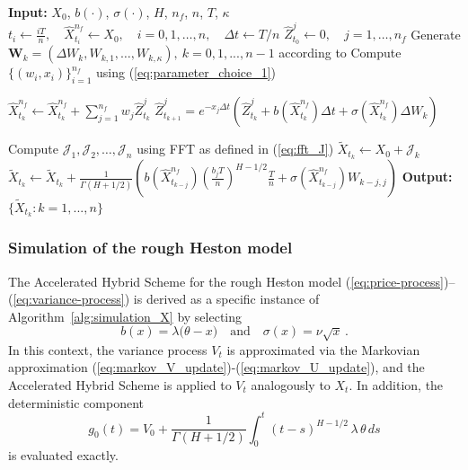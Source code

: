 \documentclass[11pt]{article}%
\theoremstyle{definition}
\begin{document}
\begin{algorithm}[tbh]
    \caption{Simulation of \(X_t\) in (\ref{eq:target_process}) using Accelerated Hybrid Scheme}
    \label{alg:simulation_X}
    \begin{algorithmic}[1]
        \STATE \textbf{Input:} \(X_0\), \(b(\cdot)\), \(\sigma(\cdot)\), \(H\), \(n_f\), \(n\), \(T\), \(\kappa\)
        \STATE \(t_i \gets \tfrac{iT}{n},\quad \widehat{X}_{t_i}^{n_f} \gets X_0,\quad i=0,1,\ldots,n,\quad \Delta t \gets T/n\)
        \STATE \(\widehat{Z}_{t_0}^j \gets 0,\quad j=1,\ldots,n_f\) 
        \STATE Generate \(\mathbf{W}_k = (\Delta W_k, W_{k,1},\ldots,W_{k,\kappa}),\ k=0,1,...,n-1\) according to \cite{bennedsen_2017_FS}
        \STATE Compute \(\{(w_i,x_i)\}_{i=1}^{n_f}\) using (\ref{eq:parameter_choice_1})

            \STATE \(\widehat{X}_{t_k}^{n_f} \gets \widehat{X}_{t_k}^{n_f} + \sum_{j=1}^{n_f} w_j \widehat{Z}_{t_k}^j\)
                \STATE \(\widehat{Z}_{t_{k+1}}^j = e^{-x_j \Delta t} \left(
                    \widehat{Z}_{t_k}^j + b(\widehat{X}_{t_k}^{n_f}) \Delta t + \sigma(\widehat{X}_{t_k}^{n_f})\Delta W_k
                    \right)
                \)
            \ENDFOR
        \ENDFOR

        \STATE Compute \(\mathcal{J}_1,\mathcal{J}_2,\ldots,\mathcal{J}_n\) using FFT as defined in (\ref{eq:fft_J})
            \STATE \(\widetilde{X}_{t_k} \gets X_0 + \mathcal{J}_k\)
                    \STATE \(\widetilde{X}_{t_k} \gets \widetilde{X}_{t_k} + \tfrac{1}{\Gamma(H+1/2)} \left(b(\widehat{X}_{t_{k-j}}^{n_f})\left(\tfrac{b_j T}{n}\right)^{H-1/2} \tfrac{T}{n} + \sigma(\widehat{X}_{t_{k-j}}^{n_f}) W_{k-j,j}\right)\)
                \ENDIF
            \ENDFOR
        \ENDFOR
        \STATE \textbf{Output:} \(\{\widetilde{X}_{t_k}: k=1,...,n\}\)
    \end{algorithmic}
\end{algorithm}

\subsubsection{Simulation of the rough Heston model } 
The Accelerated Hybrid Scheme for the rough Heston model (\ref{eq:price-process})–(\ref{eq:variance-process}) is derived as a specific instance of Algorithm~\ref{alg:simulation_X} by selecting 
\[
b(x) = \lambda\bigl(\theta - x\bigr) \quad\text{and}\quad \sigma(x) = \nu\sqrt{x}\,.
\]
In this context, the variance process \(V_t\) is approximated via the Markovian approximation (\ref{eq:markov_V_update})-(\ref{eq:markov_U_update}), and the Accelerated Hybrid Scheme is applied to \(V_t\) analogously to \(X_t\). In addition, the deterministic component 
\[
g_0(t)= V_0 + \frac{1}{\Gamma(H+1/2)}\int_{0}^{t}(t-s)^{H-1/2}\,\lambda\,\theta\,ds
\]
is evaluated exactly.
\end{document}
